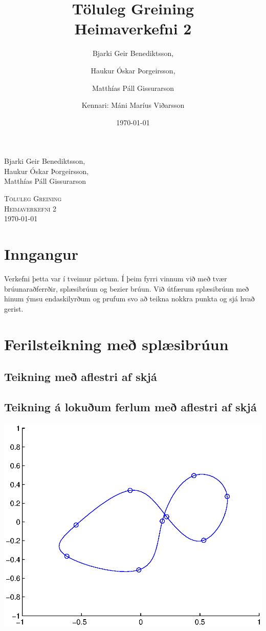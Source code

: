 \documentclass[a4]{article}
\title{Töluleg Greining\\ Heimaverkefni 2}
\date{\today{}}
\author{ 
  Bjarki Geir Benediktsson,\and
  Haukur Óskar Þorgeirsson,\and
  Matthías Páll Gissurarson \and
  Kennari: Máni Maríus Viðarsson
  }
\begin{document}
\begin{flushright}
  Bjarki Geir Benediktsson,\\
  Haukur Óskar Þorgeirsson,\\
  Matthías Páll Gissurarson\\
\end{flushright}

\begin{center}
 \textsc{ \LARGE Töluleg Greining\\
  Heimaverkefni 2\\
  \today{}
  }
  \end{center}
\vfill

\maketitle
\section*{Inngangur}
Verkefni þetta var í tveimur pörtum. Í þeim fyrri vinnum við með tvær brúunaraðferrðir, splæsibrúun og bezier brúun. Við útfærum splæsibrúun með hinum ýmsu endaskilyrðum og prufum svo að teikna nokkra punkta og sjá hvað gerist.


\section{Ferilsteikning með splæsibrúun}
\subsection{Teikning með aflestri af skjá}

\subsection{Teikning á lokuðum ferlum með aflestri af skjá}
\includegraphics[height=0.495\textheight]{Ss1.eps}\\
\end{document}
